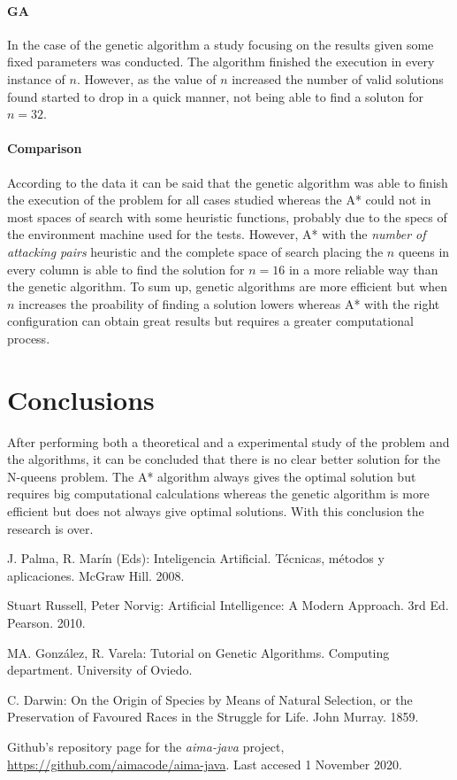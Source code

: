 \documentclass[11pt]{llncs}
\begin{document}
\paragraph{GA}
In the case of the genetic algorithm a study focusing on the results given some fixed parameters was conducted. The algorithm finished the execution in every instance of $n$. However, as the value of $n$ increased the number of valid solutions found started to drop in a quick manner, not being able to find a soluton for $n = 32$. 

\paragraph{Comparison}
According to the data it can be said that the genetic algorithm was able to finish the execution of the problem for all cases studied whereas the A* could not in most spaces of search with some heuristic functions, probably due to the specs of the environment machine used for the tests. However, A* with the \textit{number of attacking pairs} heuristic and the complete space of search placing the $n$ queens in every column is able to find the solution for $n = 16$ in a more reliable way than the genetic algorithm. To sum up, genetic algorithms are more efficient but when $n$ increases the proability of finding a solution lowers whereas A* with the right configuration can obtain great results but requires a greater computational process.

\section{Conclusions}\label{conclusions}
After performing both a theoretical and a experimental study of the problem and the algorithms, it can be concluded that there is no clear better solution for the N-queens problem. The A* algorithm always gives the optimal solution but requires big computational calculations whereas the genetic algorithm is more efficient but does not always give optimal solutions. With this conclusion the research is over.
\begin{thebibliography}{8}
J. Palma, R. Marín (Eds): Inteligencia Artificial. Técnicas, métodos y aplicaciones. McGraw Hill. 2008.

Stuart Russell, Peter Norvig: Artificial Intelligence: A Modern Approach. 3rd Ed. Pearson. 2010.

MA. González, R. Varela: Tutorial on Genetic Algorithms. Computing department. University of Oviedo.

C. Darwin: On the Origin of Species by Means of Natural Selection, or the Preservation of Favoured Races in the Struggle for Life. John Murray. 1859.
 
Github's repository page for the \textit{aima-java} project, \url{https://github.com/aimacode/aima-java}. Last accesed 1 November 2020.
\end{thebibliography}
\end{document}
